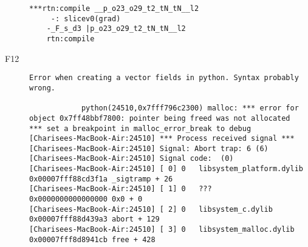 \begin{description}
\begin{lstlisting}[mathescape=true]
***rtn:compile __p_o23_o29_t2_tN_tN__l2
	 -: slicev0(grad)
	-_F_s_d3 |p_o23_o29_t2_tN_tN__l2
	rtn:compile 
	\end{lstlisting}
	    		\item[F12]
	    				\begin{lstlisting}[mathescape=true]
    		Error when creating a vector fields in python. Syntax probably wrong.
    		
    		python(24510,0x7fff796c2300) malloc: *** error for object 0x7ff48bbf7800: pointer being freed was not allocated
*** set a breakpoint in malloc_error_break to debug
[Charisees-MacBook-Air:24510] *** Process received signal ***
[Charisees-MacBook-Air:24510] Signal: Abort trap: 6 (6)
[Charisees-MacBook-Air:24510] Signal code:  (0)
[Charisees-MacBook-Air:24510] [ 0] 0   libsystem_platform.dylib            0x00007fff88cd3f1a _sigtramp + 26
[Charisees-MacBook-Air:24510] [ 1] 0   ???                                 0x0000000000000000 0x0 + 0
[Charisees-MacBook-Air:24510] [ 2] 0   libsystem_c.dylib                   0x00007fff88d439a3 abort + 129
[Charisees-MacBook-Air:24510] [ 3] 0   libsystem_malloc.dylib              0x00007fff8d8941cb free + 428
	\end{lstlisting}
\end{description}
